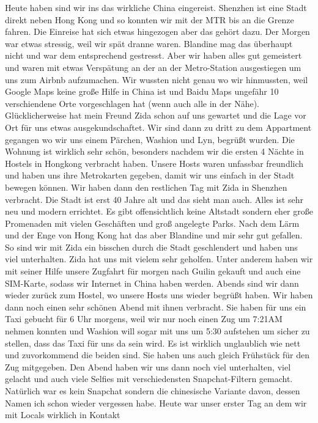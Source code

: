 \documentclass[11pt]{book}
\begin{document}
Heute haben sind wir ins das wirkliche China eingereist. Shenzhen ist eine Stadt direkt neben Hong Kong und so 
konnten wir mit der MTR bis an die Grenze fahren. Die Einreise hat sich etwas hingezogen aber das gehört dazu.
Der Morgen war etwas stressig, weil wir spät dranne waren. Blandine mag das überhaupt nicht und war dem 
entsprechend gestresst. Aber wir haben alles gut gemeistert und waren mit etwas Verspätung an der an der 
Metro-Station ausgestiegen um uns zum Airbnb aufzumachen. Wir wussten nicht genau wo wir hinmussten, weil Google
Maps keine große Hilfe in China ist und Baidu Maps ungefähr 10 verschiendene Orte vorgeschlagen hat (wenn auch alle 
in der Nähe). Glücklicherweise hat mein Freund Zida schon auf uns gewartet und die Lage vor Ort für uns etwas 
ausgekundschaftet. Wir sind dann zu dritt zu dem Appartment gegangen wo wir uns einem Pärchen, Washion und Lyn, 
begrüßt wurden. Die Wohnung ist wirklich sehr schön, besonders nachdem wir die ersten 4 Nächte in Hostels in 
Hongkong verbracht haben. Unsere Hosts waren unfassbar freundlich und haben uns ihre Metrokarten gegeben, damit 
wir uns einfach in der Stadt bewegen können. Wir haben dann den restlichen Tag mit Zida in Shenzhen verbracht. 
Die Stadt ist erst 40 Jahre alt und das sieht man auch. Alles ist sehr neu und modern errichtet. Es gibt
offensichtlich keine Altstadt sondern eher große Promenaden mit vielen Geschäften und groß angelegte Parks. 
Nach dem Lärm und der Enge von Hong Kong hat das aber Blandine und mir sehr gut gefallen. So sind wir mit 
Zida ein bisschen durch die Stadt geschlendert und haben uns viel unterhalten. Zida hat uns mit vielem sehr 
geholfen. Unter anderem haben wir mit seiner Hilfe unsere Zugfahrt für morgen nach Guilin gekauft und auch
eine SIM-Karte, sodass wir Internet in China haben werden. Abends sind wir dann wieder zurück zum Hostel, 
wo unsere Hosts uns wieder begrüßt haben. Wir haben dann noch einen sehr schönen Abend mit ihnen verbracht. 
Sie haben für uns ein Taxi gebucht für 6 Uhr morgens, weil wir nur noch einen Zug um 7:21AM nehmen konnten 
und Washion will sogar mit uns um 5:30 aufstehen um sicher zu stellen, dass das Taxi für uns da sein wird. Es 
ist wirklich unglaublich wie nett und zuvorkommend die beiden sind. Sie haben uns auch gleich Frühstück für den 
Zug mitgegeben. Den Abend haben wir uns dann noch viel unterhalten, viel gelacht und auch viele Selfies mit 
verschiedensten Snapchat-Filtern gemacht. Natürlich war es kein Snapchat sondern die chinesische Variante davon, 
dessen Namen ich schon wieder vergessen habe. Heute war unser erster Tag an dem wir mit Locals wirklich in Kontakt 
\end{document}
